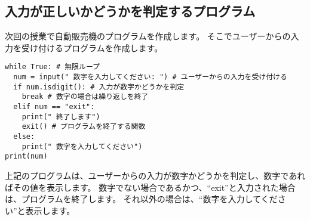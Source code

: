 \documentclass[a4paper,titlepage,dvipdfmx]{jarticle}
\begin{document}
\subsection{入力が正しいかどうかを判定するプログラム}
次回の授業で自動販売機のプログラムを作成します。
そこでユーザーからの入力を受け付けるプログラムを作成します。
\begin{lstlisting}[caption=入力が正しいかどうかを判定するプログラム,label=check]
while True: # 無限ループ
  num = input(" 数字を入力してください: ") # ユーザーからの入力を受け付ける
  if num.isdigit(): # 入力が数字かどうかを判定
    break # 数字の場合は繰り返しを終了
  elif num == "exit":
    print(" 終了します")
    exit() # プログラムを終了する関数
  else:
    print(" 数字を入力してください")
print(num)
\end{lstlisting}
上記のプログラムは、ユーザーからの入力が数字かどうかを判定し、数字であればその値を表示します。
数字でない場合であるかつ、``exit''と入力された場合は、プログラムを終了します。
それ以外の場合は、``数字を入力してください''と表示します。
\end{document}
